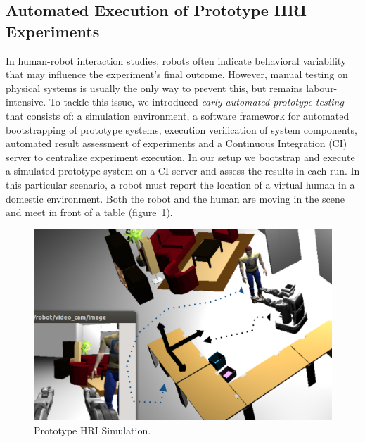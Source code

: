 \documentclass[conference]{IEEEtran}
\begin{document}
\subsection{Automated Execution of Prototype HRI Experiments}
\label{sc:ci}

In human-robot interaction studies, robots often indicate behavioral variability
that may influence the experiment's final outcome.  However, manual testing on
physical systems is usually the only way to prevent this, but remains
labour-intensive. To tackle this issue, we introduced \emph{early automated
prototype testing}~\cite{2645922} that consists of: a simulation environment, a
software framework for automated bootstrapping of prototype systems, execution
verification of system components, automated result assessment of experiments
and a Continuous Integration (CI) server to centralize experiment execution. In
our setup we bootstrap and execute a simulated prototype system on a CI server
and assess the results in each run. In this particular scenario, a robot must
report the location of a virtual human in a domestic environment. Both the
robot and the human are moving in the scene and meet in front of a table
(figure~\ref{fig|proto}).

\begin{figure}[H]
      \centering
      \includegraphics[width=0.9\linewidth]{proto-setup.png}
      \caption{Prototype HRI Simulation.}
      \label{fig|proto}
\end{figure}
\end{document}
